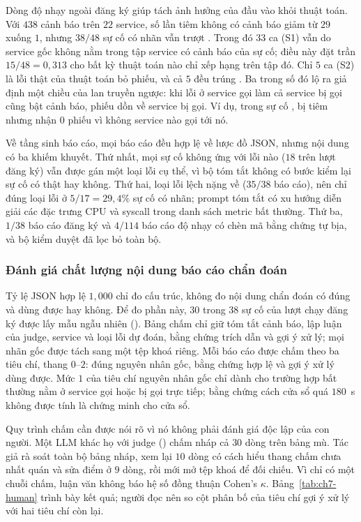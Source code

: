 Dòng độ nhạy ngoài đăng ký giúp tách ảnh hưởng của đầu vào khỏi thuật toán. Với $438$ cảnh báo trên $22$ service, số lần tiêm không có cảnh báo giảm từ $29$ xuống $1$, nhưng $38/48$ sự cố có nhãn vẫn trượt . Trong đó $33$ ca (S1) vẫn do service gốc không nằm trong tập service có cảnh báo của sự cố; điều này đặt trần $15/48 = 0{,}313$ cho bất kỳ thuật toán nào chỉ xếp hạng trên tập đó. Chỉ $5$ ca (S2) là lỗi thật của thuật toán bỏ phiếu, và cả $5$ đều trúng . Ba trong số đó lộ ra giả định một chiều của lan truyền ngược: khi lỗi ở service gọi làm cả service bị gọi cũng bật cảnh báo, phiếu dồn về service bị gọi. Ví dụ, trong sự cố ,  bị tiêm  nhưng nhận $0$ phiếu vì không service nào gọi tới nó. %

Về tầng sinh báo cáo, mọi báo cáo đều hợp lệ về lược đồ JSON, nhưng nội dung có ba khiếm khuyết. Thứ nhất, mọi sự cố không ứng với lỗi nào ($18$ trên lượt đăng ký) vẫn được gán một loại lỗi cụ thể, vì bộ tóm tắt không có bước kiểm lại sự cố có thật hay không. Thứ hai, loại lỗi lệch nặng về  ($35/38$ báo cáo), nên chỉ đúng loại lỗi ở $5/17 = 29{,}4\%$ sự cố có nhãn; prompt tóm tắt có xu hướng diễn giải các đặc trưng CPU và syscall trong danh sách metric bất thường. Thứ ba, $1/38$ báo cáo đăng ký và $4/114$ báo cáo độ nhạy có chèn mã bằng chứng tự bịa, và bộ kiểm duyệt đã lọc bỏ toàn bộ. %

\subsubsection{Đánh giá chất lượng nội dung báo cáo chẩn đoán}
\label{sec:ch7-human}

Tỷ lệ JSON hợp lệ $1{,}000$ chỉ đo cấu trúc, không đo nội dung chẩn đoán có đúng và dùng được hay không. Để đo phần này, $30$ trong $38$ sự cố của lượt chạy đăng ký được lấy mẫu ngẫu nhiên (). Bảng chấm chỉ giữ tóm tắt cảnh báo, lập luận của judge, service và loại lỗi dự đoán, bằng chứng trích dẫn và gợi ý xử lý; mọi nhãn gốc được tách sang một tệp khoá riêng. Mỗi báo cáo được chấm theo ba tiêu chí, thang $0$--$2$: đúng nguyên nhân gốc, bằng chứng hợp lệ và gợi ý xử lý dùng được. Mức $1$ của tiêu chí nguyên nhân gốc chỉ dành cho trường hợp bất thường nằm ở service gọi hoặc bị gọi trực tiếp; bằng chứng cách cửa sổ quá $180$~s không được tính là chứng minh cho cửa sổ.

Quy trình chấm cần được nói rõ vì nó không phải đánh giá độc lập của con người. Một LLM khác họ với judge () chấm nháp cả $30$ dòng trên bảng mù. Tác giả rà soát toàn bộ bảng nháp, xem lại $10$ dòng có cách hiểu thang chấm chưa nhất quán và sửa điểm ở $9$ dòng, rồi mới mở tệp khoá để đối chiếu. Vì chỉ có một chuỗi chấm, luận văn không báo hệ số đồng thuận Cohen's $\kappa$. Bảng~\ref{tab:ch7-human} trình bày kết quả; người đọc nên so cột phân bố của tiêu chí gợi ý xử lý với hai tiêu chí còn lại.

